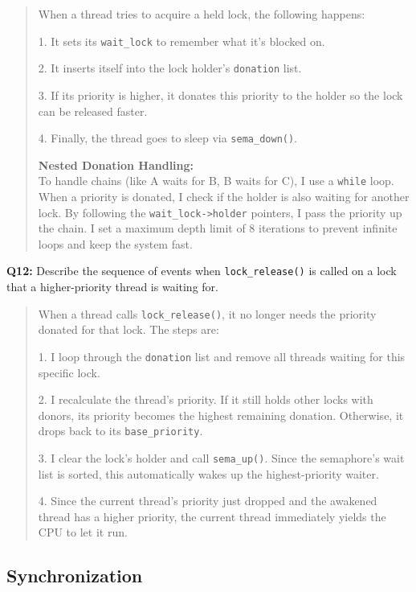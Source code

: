 \documentclass[a4paper,11pt]{paper}
\begin{document}
\begin{quote}
When a thread tries to acquire a held lock, the following happens:

1. It sets its \texttt{wait\_lock} to remember what it's blocked on.

2. It inserts itself into the lock holder's \texttt{donation} list.

3. If its priority is higher, it donates this priority to the holder so the lock can be released faster.

4. Finally, the thread goes to sleep via \texttt{sema\_down()}.

\textbf{Nested Donation Handling:}\\
To handle chains (like A waits for B, B waits for C), I use a \texttt{while} loop. When a priority is donated, I check if the holder is also waiting for another lock. By following the \texttt{wait\_lock->holder} pointers, I pass the priority up the chain. I set a maximum depth limit of 8 iterations to prevent infinite loops and keep the system fast.
\end{quote}

\textbf{Q12:} Describe the sequence of events when \texttt{lock\_release()} is
called on a lock that a higher-priority thread is waiting for.

\begin{quote}
When a thread calls \texttt{lock\_release()}, it no longer needs the priority donated for that lock. The steps are:

1. I loop through the \texttt{donation} list and remove all threads waiting for this specific lock.

2. I recalculate the thread's priority. If it still holds other locks with donors, its priority becomes the highest remaining donation. Otherwise, it drops back to its \texttt{base\_priority}.

3. I clear the lock's holder and call \texttt{sema\_up()}. Since the semaphore's wait list is sorted, this automatically wakes up the highest-priority waiter.

4. Since the current thread's priority just dropped and the awakened thread has a higher priority, the current thread immediately yields the CPU to let it run.
\end{quote}

\subsection{Synchronization}
 
\end{document}

